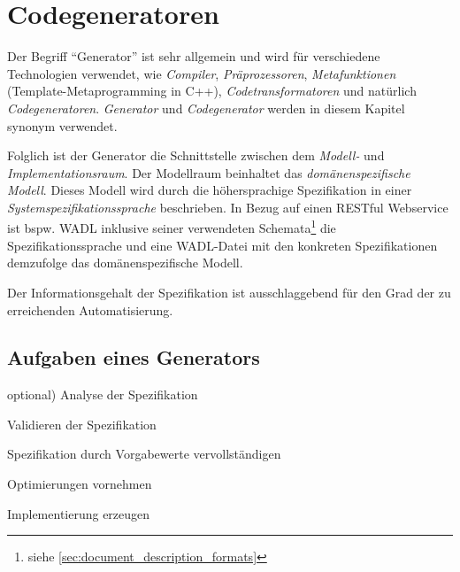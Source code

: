 \section{Codegeneratoren}


Der Begriff \enquote{Generator} ist sehr allgemein und wird für verschiedene Technologien verwendet, wie \emph{Compiler}, \emph{Präprozessoren}, \emph{Metafunktionen} (Template-Metaprogramming in C++), \emph{Codetransformatoren} und natürlich \emph{Codegeneratoren}. 
\emph{Generator} und \emph{Codegenerator} werden in diesem Kapitel synonym verwendet.


Folglich ist der Generator die Schnittstelle zwischen dem \emph{Modell-} und \emph{Implementationsraum}. Der Modellraum beinhaltet das \emph{domänenspezifische Modell}. Dieses Modell wird durch die höhersprachige Spezifikation in einer \emph{Systemspezifikationssprache} beschrieben. In Bezug auf einen RESTful Webservice ist bspw. \gls{WADL} inklusive seiner verwendeten Schemata\footnote{siehe \cref{sec:document_description_formats}} die Spezifikationssprache und eine WADL-Datei mit den konkreten Spezifikationen demzufolge das domänenspezifische Modell.

Der Informationsgehalt der Spezifikation ist ausschlaggebend für den Grad der zu erreichenden Automatisierung.

\subsection{Aufgaben eines Generators}
\label{sec:generator_tasks}

\begin{compactenum}
    \item[optional)] Analyse der Spezifikation
    \item Validieren der Spezifikation
    \item Spezifikation durch Vorgabewerte vervollständigen
    \item Optimierungen vornehmen
    \item Implementierung erzeugen
\end{compactenum}

